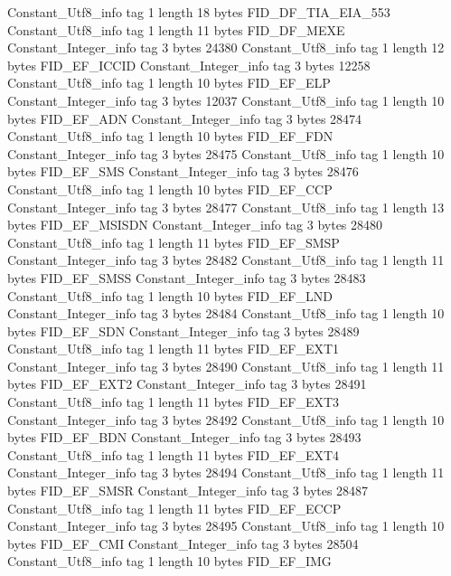 {{		Constant_Utf8_info {
			tag	1
			length	18
			bytes	FID_DF_TIA_EIA_553
		}
		Constant_Utf8_info {
			tag	1
			length	11
			bytes	FID_DF_MEXE
		}
		Constant_Integer_info {
			tag	3
			bytes	24380
		}
		Constant_Utf8_info {
			tag	1
			length	12
			bytes	FID_EF_ICCID
		}
		Constant_Integer_info {
			tag	3
			bytes	12258
		}
		Constant_Utf8_info {
			tag	1
			length	10
			bytes	FID_EF_ELP
		}
		Constant_Integer_info {
			tag	3
			bytes	12037
		}
		Constant_Utf8_info {
			tag	1
			length	10
			bytes	FID_EF_ADN
		}
		Constant_Integer_info {
			tag	3
			bytes	28474
		}
		Constant_Utf8_info {
			tag	1
			length	10
			bytes	FID_EF_FDN
		}
		Constant_Integer_info {
			tag	3
			bytes	28475
		}
		Constant_Utf8_info {
			tag	1
			length	10
			bytes	FID_EF_SMS
		}
		Constant_Integer_info {
			tag	3
			bytes	28476
		}
		Constant_Utf8_info {
			tag	1
			length	10
			bytes	FID_EF_CCP
		}
		Constant_Integer_info {
			tag	3
			bytes	28477
		}
		Constant_Utf8_info {
			tag	1
			length	13
			bytes	FID_EF_MSISDN
		}
		Constant_Integer_info {
			tag	3
			bytes	28480
		}
		Constant_Utf8_info {
			tag	1
			length	11
			bytes	FID_EF_SMSP
		}
		Constant_Integer_info {
			tag	3
			bytes	28482
		}
		Constant_Utf8_info {
			tag	1
			length	11
			bytes	FID_EF_SMSS
		}
		Constant_Integer_info {
			tag	3
			bytes	28483
		}
		Constant_Utf8_info {
			tag	1
			length	10
			bytes	FID_EF_LND
		}
		Constant_Integer_info {
			tag	3
			bytes	28484
		}
		Constant_Utf8_info {
			tag	1
			length	10
			bytes	FID_EF_SDN
		}
		Constant_Integer_info {
			tag	3
			bytes	28489
		}
		Constant_Utf8_info {
			tag	1
			length	11
			bytes	FID_EF_EXT1
		}
		Constant_Integer_info {
			tag	3
			bytes	28490
		}
		Constant_Utf8_info {
			tag	1
			length	11
			bytes	FID_EF_EXT2
		}
		Constant_Integer_info {
			tag	3
			bytes	28491
		}
		Constant_Utf8_info {
			tag	1
			length	11
			bytes	FID_EF_EXT3
		}
		Constant_Integer_info {
			tag	3
			bytes	28492
		}
		Constant_Utf8_info {
			tag	1
			length	10
			bytes	FID_EF_BDN
		}
		Constant_Integer_info {
			tag	3
			bytes	28493
		}
		Constant_Utf8_info {
			tag	1
			length	11
			bytes	FID_EF_EXT4
		}
		Constant_Integer_info {
			tag	3
			bytes	28494
		}
		Constant_Utf8_info {
			tag	1
			length	11
			bytes	FID_EF_SMSR
		}
		Constant_Integer_info {
			tag	3
			bytes	28487
		}
		Constant_Utf8_info {
			tag	1
			length	11
			bytes	FID_EF_ECCP
		}
		Constant_Integer_info {
			tag	3
			bytes	28495
		}
		Constant_Utf8_info {
			tag	1
			length	10
			bytes	FID_EF_CMI
		}
		Constant_Integer_info {
			tag	3
			bytes	28504
		}
		Constant_Utf8_info {
			tag	1
			length	10
			bytes	FID_EF_IMG
}}}
